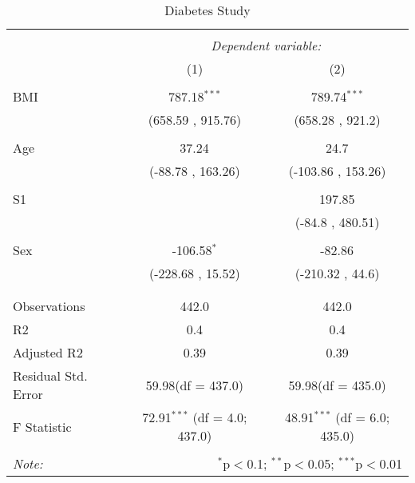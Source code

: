 \documentclass[12pt]{article}
\numberwithin{equation}{subsection}
\begin{document}
\begin{table}[!htbp] \centering
  \caption{Diabetes Study}
  \label{}
\begin{tabular}{@{\extracolsep{5pt}}lcc}
\\[-1.8ex]\hline
\hline \\[-1.8ex]
& \multicolumn{2}{c}{\textit{Dependent variable:}} \
\cr \cline{2-3}
\\[-1.8ex] & (1) & (2) \\
\hline \\[-1.8ex]
 BMI & 787.18$^{***}$ & 789.74$^{***}$ \\
  & (658.59 , 915.76) & (658.28 , 921.2) \\
  & & \\
 Age & 37.24$^{}$ & 24.7$^{}$ \\
  & (-88.78 , 163.26) & (-103.86 , 153.26) \\
  & & \\
 S1 & & 197.85$^{}$ \\
  & & (-84.8 , 480.51) \\
  & & \\
 Sex & -106.58$^{*}$ & -82.86$^{}$ \\
  & (-228.68 , 15.52) & (-210.32 , 44.6) \\
  & & \\
\hline \\[-1.8ex]
 Observations & 442.0 & 442.0 \\
 R${2}$ & 0.4 & 0.4 \\
 Adjusted R${2}$ & 0.39 & 0.39 \\
 Residual Std. Error & 59.98(df = 437.0) & 59.98(df = 435.0)  \\
 F Statistic & 72.91$^{***}$ (df = 4.0; 437.0) & 48.91$^{***}$ (df = 6.0; 435.0) \\
\hline
\hline \\[-1.8ex]
\textit{Note:} & \multicolumn{2}{r}{$^{*}$p$<$0.1; $^{**}$p$<$0.05; $^{***}$p$<$0.01} \\
\end{tabular}
\end{table}
\end{document}
